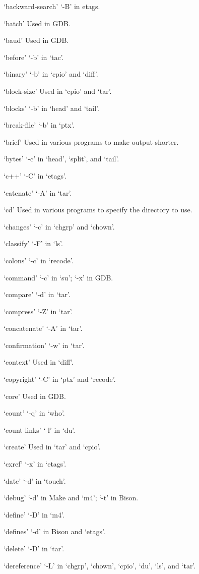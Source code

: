 `backward-search'
     `-B' in etags.

`batch'
     Used in GDB.

`baud'
     Used in GDB.

`before'
     `-b' in `tac'.

`binary'
     `-b' in `cpio' and `diff'.

`block-size'
     Used in `cpio' and `tar'.

`blocks'
     `-b' in `head' and `tail'.

`break-file'
     `-b' in `ptx'.

`brief'
     Used in various programs to make output shorter.

`bytes'
     `-c' in `head', `split', and `tail'.

`c++'
     `-C' in `etags'.

`catenate'
     `-A' in `tar'.

`cd'
     Used in various programs to specify the directory to use.

`changes'
     `-c' in `chgrp' and `chown'.

`classify'
     `-F' in `ls'.

`colons'
     `-c' in `recode'.

`command'
     `-c' in `su'; `-x' in GDB.

`compare'
     `-d' in `tar'.

`compress'
     `-Z' in `tar'.

`concatenate'
     `-A' in `tar'.

`confirmation'
     `-w' in `tar'.

`context'
     Used in `diff'.

`copyright'
     `-C' in `ptx' and `recode'.

`core'
     Used in GDB.

`count'
     `-q' in `who'.

`count-links'
     `-l' in `du'.

`create'
     Used in `tar' and `cpio'.

`cxref'
     `-x' in `etags'.

`date'
     `-d' in `touch'.

`debug'
     `-d' in Make and `m4'; `-t' in Bison.

`define'
     `-D' in `m4'.

`defines'
     `-d' in Bison and `etags'.

`delete'
     `-D' in `tar'.

`dereference'
     `-L' in `chgrp', `chown', `cpio', `du', `ls', and `tar'.

